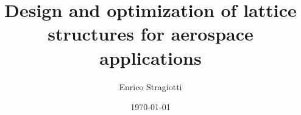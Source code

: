 \documentclass[
	fontsize=11pt, %
	twoside=true, %
	secnumdepth=2, %
	listof=totoc, %
]{kaobook}
\begin{document}

\titlehead{PhD manuscript}
\title[Design and optimisation of lattice structures for aerospace applications]{Design and optimization of lattice structures for aerospace applications}
\author[ES]{Enrico Stragiotti}
\date{\today}
\publishers{ONERA -- ISAE Supaero}


\address{1: ONERA - The French Aerospace Lab\\
DMAS - Département matériaux et structures\\
92320 Châtillon, France\\
\{francois-xavier.irisarri, cedric.julien\}@onera.fr\\
\
\\
2: ICA - Institut Clément Ader\\
ISAE - SUPAERO\\
31400 Toulouse, France\\
joseph.morlier@isae-supaero.fr\\
}


\frontmatter %


\makeatletter
\end{document}
